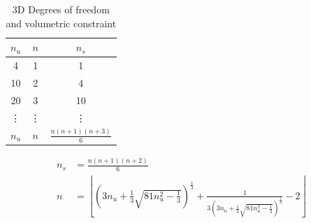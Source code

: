 \begin{table}[ht!]
\centering
\caption{3D Degrees of freedom and volumetric constraint}
\label{tab:constraint_3D}
\begin{tabular}{ccc}
\toprule
    $n_u$ & $n$ & $n_s$ \\
\midrule
4  & 1 & 1 \\
10 & 2 & 4 \\
20 & 3 & 10 \\
\vdots & \vdots & \vdots \\
$n_u$ & $n$ & $\frac{n(n+1)(n+3)}{6}$ \\
\bottomrule
\end{tabular}
\end{table}

\begin{align}
    n_s &= \frac{n(n + 1)(n + 2)}{6} \\ 
    n&= 
    \left \lfloor
    \left (3n_u + \frac{1}{3}\sqrt{81n_u^2 - \frac{1}{3}} \right )^{\frac{1}{3}}
    +
    \frac{1}{
        3\left (3n_u + \frac{1}{3}\sqrt{81n_u^2 - \frac{1}{3}} \right )^{\frac{1}{3}}
    } - 2
    \right \rfloor
\end{align}

